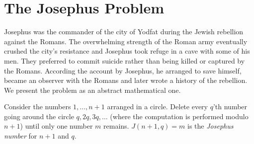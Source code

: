 
\section{The Josephus Problem}\label{s.josephus}

Josephus was the commander of the city of Yodfat during the Jewish rebellion against the Romans. The overwhelming strength of the Roman army eventually crushed the city's resistance and Josephus took refuge in a cave with some of his men. They preferred to commit suicide rather than being killed or captured by the Romans. According the account by Josephus, he arranged to save himself, became an observer with the Romans and later wrote a history of the rebellion. We present the problem as an abstract  mathematical one.

\begin{definition}
Consider the numbers $1,\ldots,n\!+\!1$ arranged in a circle. Delete every $q$'th number going around the circle $q, 2q, 3q, \ldots$ (where the computation is performed modulo $n\!+\!1$) until only one number $m$ remains. $J(n+1,q)=m$ is the \emph{Josephus number} for $n+1$ and $q$.
\end{definition}

